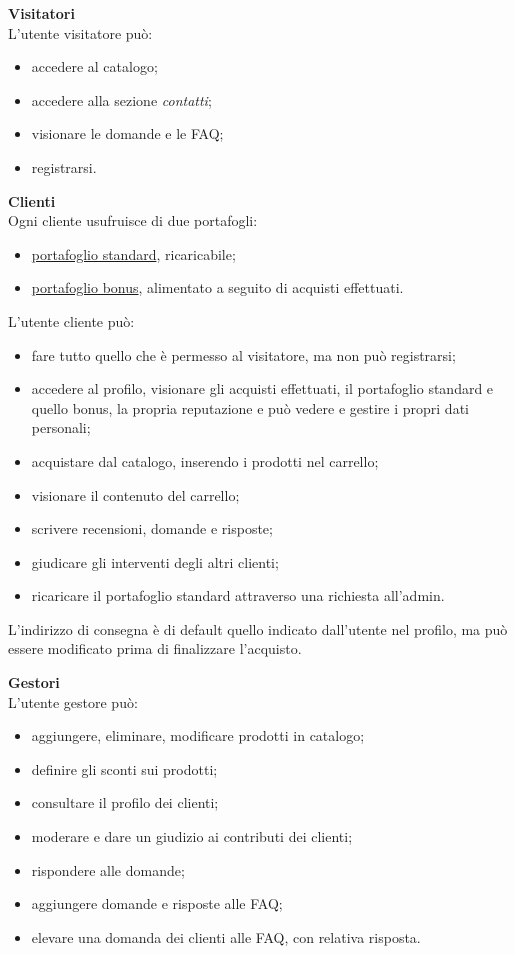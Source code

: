 \documentclass[a4paper, 14pt]{article}
\begin{document}
\begin{flushleft}
			\bigskip \textbf{Visitatori} \\ \smallskip
			L'utente visitatore può:
			\begin{itemize}
				\item accedere al catalogo;
				\item accedere alla sezione \textit{contatti};
				\item visionare le domande e le FAQ;
				\item registrarsi.
			\end{itemize}
			
			\bigskip \textbf{Clienti} \\ \smallskip
			Ogni cliente usufruisce di due portafogli:
			\begin{itemize}
				\item \underline{portafoglio standard}, ricaricabile;
				\item \underline{portafoglio bonus}, alimentato a seguito di acquisti effettuati.
			\end{itemize}
			
			L'utente cliente può:
			\begin{itemize}
				\item fare tutto quello che è permesso al visitatore, ma non può registrarsi;
				\item accedere al profilo, visionare gli acquisti effettuati, il portafoglio
				standard e quello bonus, la propria reputazione e può vedere e gestire i propri dati personali;
				\item acquistare dal catalogo, inserendo i prodotti nel carrello;
				\item visionare il contenuto del carrello;
				\item scrivere recensioni, domande e risposte;
				\item giudicare gli interventi degli altri clienti;
				\item ricaricare il portafoglio standard attraverso una richiesta all'admin.
			\end{itemize}
			L’indirizzo di consegna è di default quello indicato dall’utente nel profilo, ma può essere
			modificato prima di finalizzare l’acquisto. 
		
			\bigskip \textbf{Gestori} \\ \smallskip
			L'utente gestore può:
			\begin{itemize}
				\item aggiungere, eliminare, modificare prodotti in catalogo;
				\item definire gli sconti sui prodotti;
				\item consultare il profilo dei clienti;
				\item moderare e dare un giudizio ai contributi dei clienti;
				\item rispondere alle domande;
				\item aggiungere domande e risposte alle FAQ;
				\item elevare una domanda dei clienti alle FAQ, con relativa risposta.
			\end{itemize}
		

\end{flushleft}
\end{document}
